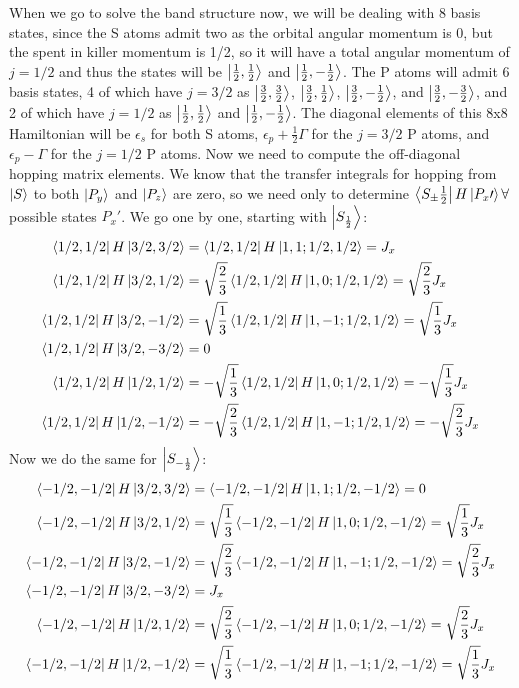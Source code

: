 \documentclass{article}
\begin{document}
When we go to solve the band structure now, we will be dealing with 8 basis states, since the S atoms admit two as the orbital angular momentum is 0, but the spent in killer momentum is 1/2, so it will have a total angular momentum of $j=1/2$ and thus the states will be $\ket{\frac{1}{2}, \frac{1}{2}}$ and $\ket{\frac{1}{2}, -\frac{1}{2}}$. The P atoms will admit 6 basis states, 4 of which have $j=3/2$ as $\ket{\frac{3}{2}, \frac{3}{2}}$, $\ket{\frac{3}{2}, \frac{1}{2}}$, $\ket{\frac{3}{2}, -\frac{1}{2}}$, and $\ket{\frac{3}{2}, -\frac{3}{2}}$, and 2 of which have $j=1/2$ as $\ket{\frac{1}{2}, \frac{1}{2}}$ and $\ket{\frac{1}{2}, -\frac{1}{2}}$. The diagonal elements of this 8x8 Hamiltonian will be $\epsilon_s$ for both S atoms, $\epsilon_p + \frac{1}{2}\Gamma$ for the $j=3/2$ P atoms, and $\epsilon_p - \Gamma$ for the $j=1/2$ P atoms. Now we need to compute the off-diagonal hopping matrix elements. We know that the transfer integrals for hopping from $\ket{S}$ to both $\ket{P_y}$ and $\ket{P_z}$ are zero, so we need only to determine $\bra{S_{\pm} \frac{1}{2}}H\ket{P_{x}\prime} \forall$ possible states $P_{x}\prime$. We go one by one, starting with $\ket{S_{\frac{1}{2}}}$:
\begin{align}
    \bra{1/2,1/2}H\ket{3/2,3/2} &= \bra{1/2,1/2}H\ket{1,1;1/2,1/2} = J_x\\
    \bra{1/2,1/2}H\ket{3/2,1/2} &= \sqrt{\frac{2}{3}} \bra{1/2,1/2}H\ket{1,0;1/2,1/2} = \sqrt{\frac{2}{3}}J_x\\
    \bra{1/2,1/2}H\ket{3/2,-1/2} &= \sqrt{\frac{1}{3}} \bra{1/2,1/2}H\ket{1,-1;1/2,1/2} = \sqrt{\frac{1}{3}}J_x\\
    \bra{1/2,1/2}H\ket{3/2,-3/2} &= 0\\
    \bra{1/2,1/2}H\ket{1/2,1/2} &= -\sqrt{\frac{1}{3}} \bra{1/2,1/2}H\ket{1,0;1/2,1/2} = -\sqrt{\frac{1}{3}}J_x\\
    \bra{1/2,1/2}H\ket{1/2,-1/2} &= -\sqrt{\frac{2}{3}} \bra{1/2,1/2}H\ket{1,-1;1/2,1/2} = -\sqrt{\frac{2}{3}}J_x\\
\end{align}
Now we do the same for $\ket{S_{-\frac{1}{2}}}$:
\begin{align}
    \bra{-1/2,-1/2}H\ket{3/2,3/2} &= \bra{-1/2,-1/2}H\ket{1,1;1/2,-1/2} = 0\\
    \bra{-1/2,-1/2}H\ket{3/2,1/2} &= \sqrt{\frac{1}{3}} \bra{-1/2,-1/2}H\ket{1,0;1/2,-1/2} = \sqrt{\frac{1}{3}}J_x\\
    \bra{-1/2,-1/2}H\ket{3/2,-1/2} &= \sqrt{\frac{2}{3}} \bra{-1/2,-1/2}H\ket{1,-1;1/2,-1/2} = \sqrt{\frac{2}{3}}J_x\\
    \bra{-1/2,-1/2}H\ket{3/2,-3/2} &= J_x\\
    \bra{-1/2,-1/2}H\ket{1/2,1/2} &= \sqrt{\frac{2}{3}} \bra{-1/2,-1/2}H\ket{1,0;1/2,-1/2} = \sqrt{\frac{2}{3}}J_x\\
    \bra{-1/2,-1/2}H\ket{1/2,-1/2} &= \sqrt{\frac{1}{3}} \bra{-1/2,-1/2}H\ket{1,-1;1/2,-1/2} = \sqrt{\frac{1}{3}}J_x\\
\end{align}
\end{document}
